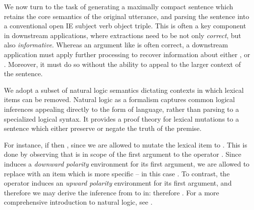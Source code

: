 
We now turn to the task of generating a maximally compact sentence which retains
  the core semantics of the original utterance, and parsing the sentence
  into a conventional open IE subject verb object triple.
This is often a key component in downstream applications, where extractions
  need to be not only \textit{correct}, but also \textit{informative}.
Whereas an argument like  is often correct,
  a downstream application must apply further processing to recover information
  about either , or .
Moreover, it must do so without the ability to appeal to the larger context
  of the sentence.

We adopt a subset of natural logic semantics dictating
  contexts in which lexical items can be removed.
Natural logic as a formalism captures common logical inferences
  appealing directly to the form of language, rather than parsing to a
  specialized logical syntax.
It provides a proof theory for lexical mutations to a sentence which either
  preserve or negate the truth of the premise.

For instance, if  then 
  , since we are allowed to mutate
  the lexical item  to .
This is done by observing that  is in scope of the first
  argument to the operator .
Since  induces a \textit{downward polarity} environment for
  its first argument, we are allowed
  to replace  with an item which is more specific -- in this case
  .
To contrast, the operator  induces an \textit{upward polarity}
  environment for its first argument,
  and therefore we may derive the inference from
   to  in:
   therefore .
For a more comprehensive introduction to natural logic, see
  .

